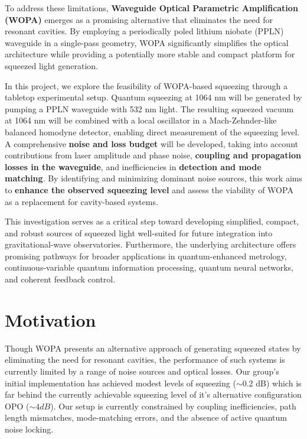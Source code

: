 \documentclass[colorlinks=true,pdfstartview=FitV,linkcolor=blue,
citecolor=red,urlcolor=magenta]{ligodoc}
\begin{document}
To address these limitations, \textbf{Waveguide Optical Parametric Amplification (WOPA)} emerges as a promising alternative that eliminates the need for resonant cavities. By employing a periodically poled lithium niobate (PPLN) waveguide in a single-pass geometry, WOPA significantly simplifies the optical architecture while providing a potentially more stable and compact platform for squeezed light generation.

In this project, we explore the feasibility of WOPA-based squeezing through a tabletop experimental setup. Quantum squeezing at 1064 nm will be generated by pumping a PPLN waveguide with 532 nm light. The resulting squeezed vacuum at 1064 nm will be combined with a local oscillator in a Mach-Zehnder-like balanced homodyne detector, enabling direct measurement of the squeezing level. A comprehensive \textbf{noise and loss budget} will be developed, taking into account contributions from laser amplitude and phase noise, \textbf{coupling and propagation losses in the waveguide}, and inefficiencies in \textbf{detection and mode matching}. By identifying and minimizing dominant noise sources, this work aims to \textbf{enhance the observed squeezing level} and assess the viability of WOPA as a replacement for cavity-based systems.

This investigation serves as a critical step toward developing simplified, compact, and robust sources of squeezed light well-suited for future integration into gravitational-wave observatories. Furthermore, the underlying architecture offers promising pathways for broader applications in quantum-enhanced metrology, continuous-variable quantum information processing, quantum neural networks, and coherent feedback control.
\section{Motivation}


Though WOPA presents an alternative approach of generating squeezed states by eliminating the need for resonant cavities, the performance of such systems is currently limited by a range of noise sources and optical losses. Our group’s initial implementation has achieved modest levels of squeezing ($\sim$0.2 dB) which is far behind the currently achievable squeezing level of it's alternative configuration OPO ($\sim 4 dB$). Our setup is currently constrained by coupling inefficiencies, path length mismatches, mode-matching errors, and the absence of active quantum noise locking.
\end{document}
